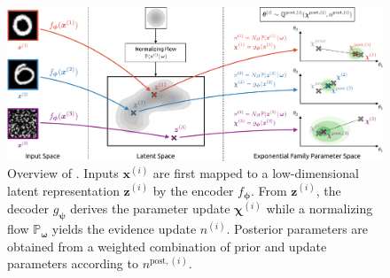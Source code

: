 \begin{figure}[t]
    \centering
    \includegraphics[width=.75\linewidth]{sections/007_iclr2022/resources/npn-crop.pdf}
    \caption{Overview of \NatPN{}. Inputs $\bm{x}^{(i)}$ are first mapped to a low-dimensional latent representation $\bm{z}^{(i)}$ by the encoder $f_{\bm{\phi}}$. From $\bm{z}^{(i)}$, the decoder $g_{\bm{\psi}}$ derives the parameter update $\bm{\chi}^{(i)}$ while a normalizing flow $\mathbb{P}_{\bm{\omega}}$ yields the evidence update $n^{(i)}$. Posterior parameters are obtained from a weighted combination of prior and update parameters according to $n^{\text{post},(i)}$.}
    \label{fig:npn}
    \vspace{-6mm}
\end{figure}

